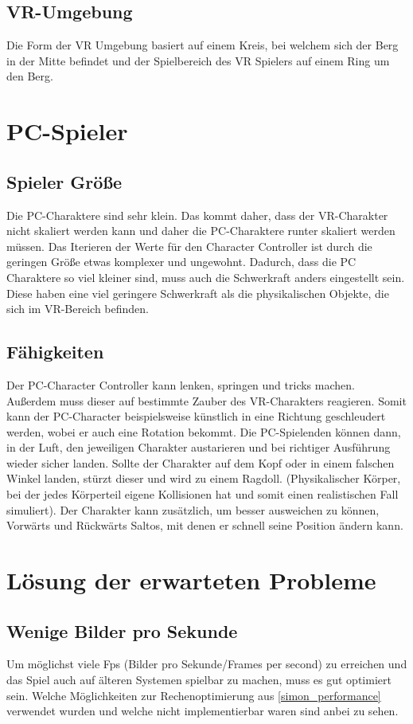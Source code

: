 \subsection{VR-Umgebung}
Die Form der VR Umgebung basiert auf einem Kreis, bei welchem sich der Berg in der Mitte befindet und der Spielbereich des VR Spielers auf einem Ring um den Berg.

\section{PC-Spieler}
\subsection{Spieler Größe}
Die PC-Charaktere sind sehr klein. Das kommt daher, dass der VR-Charakter nicht skaliert werden kann und daher die PC-Charaktere runter skaliert werden müssen. Das Iterieren der Werte für den Character Controller ist durch die geringen Größe etwas komplexer und ungewohnt. Dadurch, dass die PC Charaktere so viel kleiner sind, muss auch die Schwerkraft anders eingestellt sein. Diese haben eine viel geringere Schwerkraft als die physikalischen Objekte, die sich im VR-Bereich befinden.

\subsection{Fähigkeiten}
Der PC-Character Controller kann lenken, springen und tricks machen. Außerdem muss dieser auf bestimmte Zauber des VR-Charakters reagieren. Somit kann der PC-Character beispielsweise künstlich in eine Richtung geschleudert werden, wobei er auch eine Rotation bekommt. Die PC-Spielenden können dann, in der Luft, den jeweiligen Charakter austarieren und bei richtiger Ausführung wieder sicher landen. Sollte der Charakter auf dem Kopf oder in einem falschen Winkel landen, stürzt dieser und wird zu einem Ragdoll. (Physikalischer Körper, bei der jedes Körperteil eigene Kollisionen hat und somit einen realistischen Fall simuliert).
Der Charakter kann zusätzlich, um besser ausweichen zu können, Vorwärts und Rückwärts Saltos, mit denen er schnell seine Position ändern kann.

\section{Lösung der erwarteten Probleme}\label{simon_problems}

\subsection{Wenige Bilder pro Sekunde}
Um möglichst viele Fps (Bilder pro Sekunde/Frames per second) zu erreichen und das Spiel auch auf älteren Systemen spielbar zu machen, muss es gut optimiert sein. Welche Möglichkeiten zur Rechenoptimierung aus \ref{simon_performance} verwendet wurden und welche nicht implementierbar waren sind anbei zu sehen.

